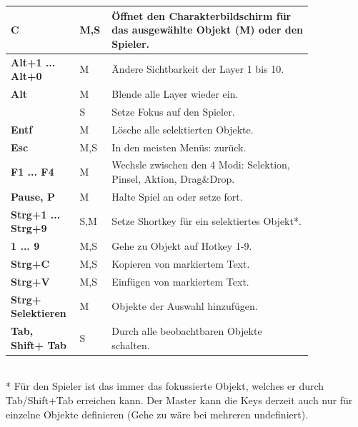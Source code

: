 \documentclass[german,10pt,a4paper,twocolumn,colorscheme=darkblue]{orarticle}
\begin{document}
		\begin{supertabular}{p{0.15\linewidth}|p{0.075\linewidth}|p{0.62\linewidth}}
			\textbf{C}               & M,S & Öffnet den Charakterbildschirm für das ausgewählte Objekt (M) oder den Spieler. \\\hline
			\textbf{Alt+1 ... Alt+0} & M & Ändere Sichtbarkeit der Layer 1 bis 10. \\\hline
			\textbf{Alt}             & M & Blende alle Layer wieder ein.\\
			                         & S & Setze Fokus auf den Spieler.\\\hline
			\textbf{Entf}			 & M & Lösche alle selektierten Objekte.\\\hline
			\textbf{Esc}			 & M,S & In den meisten Menüs: zurück.\\\hline
			\textbf{F1 ... F4}		 & M & Wechsle zwischen den 4 Modi: Selektion, Pinsel, Aktion, Drag\&Drop.\\\hline
			\textbf{Pause, P}		 & M & Halte Spiel an oder setze fort.\\\hline
			\textbf{Strg+1 ... Strg+9}& S,M & Setze Shortkey für ein selektiertes Objekt*.\\\hline
			\textbf{1 ... 9}		 & M,S & Gehe zu Objekt auf Hotkey 1-9.\\\hline
			\textbf{Strg+C}			 & M,S & Kopieren von markiertem Text.\\\hline
			\textbf{Strg+V}			 & M,S & Einfügen von markiertem Text.\\\hline
			\textbf{Strg+ Selektieren}& M & Objekte der Auswahl hinzufügen.\\\hline
			\textbf{Tab, Shift+ Tab}	 & S & Durch alle beobachtbaren Objekte schalten.\cr
		\end{supertabular}\\
	
		* Für den Spieler ist das immer das fokussierte Objekt, welches er durch Tab/Shift+Tab erreichen kann. Der Master kann die Keys derzeit auch nur für einzelne Objekte definieren (Gehe zu wäre bei mehreren undefiniert).
	
\end{document}
